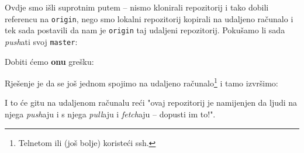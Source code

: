 Ovdje smo išli suprotnim putem -- nismo klonirali repozitorij i tako dobili referencu na \verb+origin+, nego smo lokalni repozitorij kopirali na udaljeno računalo i tek sada postavili da nam je \verb+origin+ taj udaljeni repozitorij.
Pokušamo li sada \emph{push}ati svoj \verb+master+:


Dobiti ćemo \textbf{onu} grešku:


Rješenje je da se još jednom spojimo na udaljeno računalo\footnote{Telnetom ili (još bolje) koristeći ssh.} i tamo izvršimo:


I to će gitu na udaljenom računalu reći "ovaj repozitorij je namijenjen da ljudi na njega \emph{push}aju i s njega \emph{pull}aju i \emph{fetch}aju -- dopusti im to!".


